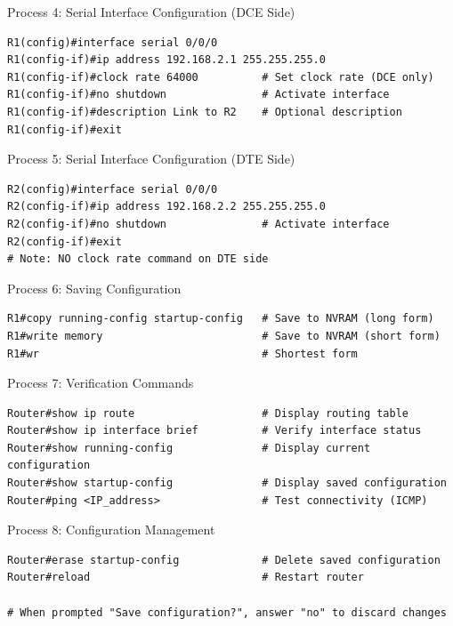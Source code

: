 \documentclass[12pt,a4paper]{article}
\begin{document}
\begin{commandbox}{Process 4: Serial Interface Configuration (DCE Side)}
\begin{lstlisting}
R1(config)#interface serial 0/0/0
R1(config-if)#ip address 192.168.2.1 255.255.255.0
R1(config-if)#clock rate 64000          # Set clock rate (DCE only)
R1(config-if)#no shutdown               # Activate interface
R1(config-if)#description Link to R2    # Optional description
R1(config-if)#exit
\end{lstlisting}
\end{commandbox}

\begin{commandbox}{Process 5: Serial Interface Configuration (DTE Side)}
\begin{lstlisting}
R2(config)#interface serial 0/0/0
R2(config-if)#ip address 192.168.2.2 255.255.255.0
R2(config-if)#no shutdown               # Activate interface
R2(config-if)#exit
# Note: NO clock rate command on DTE side
\end{lstlisting}
\end{commandbox}

\begin{commandbox}{Process 6: Saving Configuration}
\begin{lstlisting}
R1#copy running-config startup-config   # Save to NVRAM (long form)
R1#write memory                         # Save to NVRAM (short form)
R1#wr                                   # Shortest form
\end{lstlisting}
\end{commandbox}

\begin{commandbox}{Process 7: Verification Commands}
\begin{lstlisting}
Router#show ip route                    # Display routing table
Router#show ip interface brief          # Verify interface status
Router#show running-config              # Display current configuration
Router#show startup-config              # Display saved configuration
Router#ping <IP_address>                # Test connectivity (ICMP)
\end{lstlisting}
\end{commandbox}

\begin{commandbox}{Process 8: Configuration Management}
\begin{lstlisting}
Router#erase startup-config             # Delete saved configuration
Router#reload                           # Restart router

# When prompted "Save configuration?", answer "no" to discard changes
\end{lstlisting}
\end{commandbox}
\end{document}
